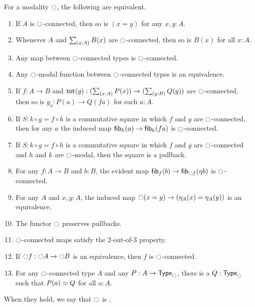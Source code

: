 \begin{thm}\label{thm:lex-modalities}
  For a modality $\modal$, the following are equivalent.
  \begin{enumerate}
  \item If $A$ is $\modal$-connected, then so is $(x=y)$ for any $x,y:A$.\label{item:mu0}
  \item Whenever $A$ and $\sm{x:A}B(x)$ are $\modal$-connected, then so is $B(x)$ for all $x:A$.\label{item:mu1}
  \item Any map between $\modal$-connected types is $\modal$-connected.\label{item:mu1a}
  \item Any $\modal$-modal function between $\modal$-connected types is an equivalence.\label{item:mu1b}
  \item If $f:A\to B$ and $\total g:(\sm{x:A} P(x)) \to (\sm{y:B} Q(y))$ are $\modal$-connected, then so is $g_a:P(a)\to Q(fa)$ for each $a:A$.\label{item:mu3b}
  \item If $S:k\circ g = f\circ h$ is a commutative square in which $f$ and $g$ are $\modal$-connected, then for any $a$ the induced map $\fib{h}{a} \to \fib{k}{fa}$ is $\modal$-connected.\label{item:mu3c}
  \item If $S:k\circ g = f\circ h$ is a commutative square in which $f$ and $g$ are $\modal$-connected and $h$ and $k$ are $\modal$-modal, then the square is a pullback.\label{item:mu3d}
  \item For any $f:A\to B$ and $b:B$, the evident map $\fib{f}{b} \to \fib{\modal f}{\modalunit b}$ is $\modal$-connected.\label{item:mu3a}
  \item For any $A$ and $x,y:A$, the induced map $\modal(x=y) \to (\modalunit[A](x) = \modalunit[A](y))$ is an equivalence.\label{item:mu6}
  \item The functor $\modal$ preserves pullbacks.\label{item:mu3}
  \item $\modal$-connected maps satisfy the 2-out-of-3 property.\label{item:mu4}
  \item If $\modal f: \modal A\to \modal B$ is an equivalence, then $f$ is $\modal$-connected.\label{item:mu5}
  \item For any $\modal$-connected type $A$ and any $P:A\to \modaltype$, there is a $Q:\modaltype$ such that $P(a)\eqvsym Q$ for all $a:A$.\label{item:mu2}
  \end{enumerate}
  When they hold, we say that $\modal$ is .
\end{thm}

